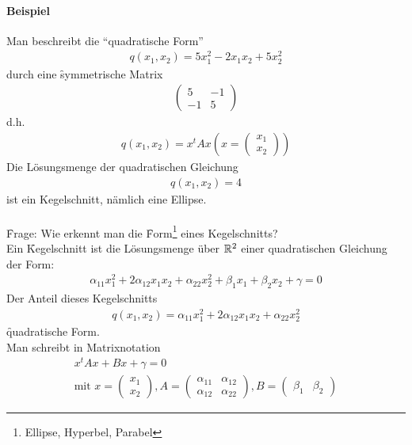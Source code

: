 \paragraph{Beispiel}
Man beschreibt die ``quadratische Form''
\begin{align}
q(x_1, x_2) = 5 x_{1}^{2} - 2x_1 x_2 + 5x_{2}^{2}
\end{align}
durch eine \f{symmetrische Matrix}
\begin{align}
\begin{pmatrix} 5 & -1 \\ -1 & 5\end{pmatrix}
\end{align}
d.h. 
\begin{align}
q(x_1, x_2) = x^t A x \left( x = \begin{pmatrix} x_1 \\ x_2 \end{pmatrix}\right)
\end{align}
Die Lösungsmenge der quadratischen Gleichung 
\begin{align}
q(x_1, x_2) = 4
\end{align}
ist ein Kegelschnitt, nämlich eine Ellipse. \\\\
\f{Frage:} Wie erkennt man die \f{Form}\footnote{Ellipse, Hyperbel, Parabel} eines Kegelschnitts?\\
Ein \f{Kegelschnitt} ist die Lösungsmenge über $\mathbb{R}^2$ einer quadratischen Gleichung der Form:
\begin{align}
\alpha_{11} x_{1}^{2} + 2 \alpha_{12} x_1 x_2 + \alpha_{22} x_{2}^{2} + \beta_1 x_1 + \beta_2 x_2 + \gamma = 0
\end{align}
Der Anteil dieses Kegelschnitts
\begin{align}
q(x_1, x_2) = \alpha_{11} x_{1}^{2} + 2 \alpha_{12} x_1 x_2 + \alpha_{22} x_{2}^{2}
\end{align}
\f{quadratische Form}. \\
Man schreibt in Matrixnotation
\begin{align}
x^t A x + Bx + \gamma = 0 \\
\text{mit } x = \begin{pmatrix} x_1 \\ x_2 \end{pmatrix}, A = \begin{pmatrix} \alpha_{11} & \alpha_{12} \\ \alpha_{12} & \alpha_{22} \end{pmatrix}, B = \begin{pmatrix} \beta_1 & \beta_2\end{pmatrix}
\end{align}
